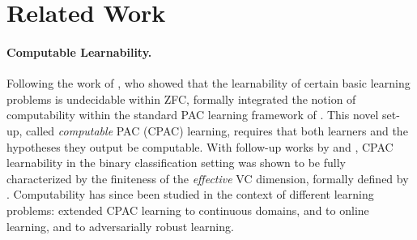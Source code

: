 \section{Related Work}
\paragraph{Computable Learnability.}
Following the work of \cite{ben2019learning}, who showed that the learnability of certain basic learning problems is undecidable within ZFC, \cite{agarwal2020learnability} formally integrated the notion of computability within the standard PAC learning framework of \cite{valiant1984theory}.
This novel set-up,  called \emph{computable} PAC (CPAC) learning, requires that both learners and the hypotheses they output be computable.
With follow-up works by \cite{sterkenburg2022characterizations} and \cite{delle2023find}, CPAC learnability in the binary classification setting was shown to be fully characterized by the finiteness of the \emph{effective} VC dimension, formally defined by \cite{delle2023find}.
Computability has since been studied in the context of different learning problems: \cite{ackerman2022computable} extended CPAC learning to continuous domains, \cite{hasrati2023computable} and \cite{delle2024effective} to online learning, and  \cite{gourdeau2024computability} to adversarially robust learning.


